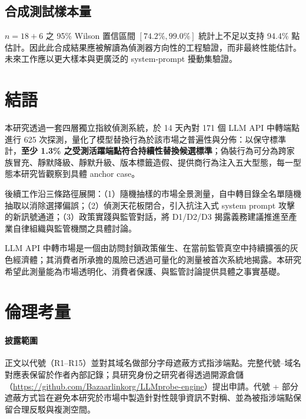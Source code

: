\documentclass[UTF8,fontset=none,10pt,a4paper,twocolumn]{ctexart}
\begin{document}
\subsection{合成測試樣本量}
$n{=}18+6$ 之 95\% Wilson 置信區間 $[74.2\%, 99.0\%]$ 統計上不足以支持 94.4\% 點估計。因此此合成結果應被解讀為偵測器方向性的工程驗證，而非最終性能估計。未來工作應以更大樣本與更廣泛的 system-prompt 擾動集驗證。

\section{結語}\label{sec:conclusion}

本研究透過一套四層獨立指紋偵測系統，於 14 天內對 171 個 LLM API 中轉端點進行 625 次探測，量化了模型替換行為於該市場之普遍性與分佈：以保守標準計，\textbf{至少 1.3\% 之受測活躍端點符合持續性替換候選標準}；偽裝行為可分為跨家族冒充、靜默降級、靜默升級、版本標籤造假、提供商行為注入五大型態，每一型態本研究皆觀察到具體 anchor case。

後續工作沿三條路徑展開：（1）隨機抽樣的市場全景測量，自中轉目錄全名單隨機抽取以消除選擇偏誤；（2）偵測天花板閉合，引入抗注入式 system prompt 攻擊的新訊號通道；（3）政策實踐與監管對話，將 D1/D2/D3 揭露義務建議推進至產業自律組織與監管機關之具體討論。

LLM API 中轉市場是一個由訪問封鎖政策催生、在當前監管真空中持續擴張的灰色經濟體；其消費者所承擔的風險已透過可量化的測量被首次系統地揭露。本研究希望此測量能為市場透明化、消費者保護、與監管討論提供具體之事實基礎。




\appendix
\section{倫理考量}\label{app:ethics}

\paragraph{披露範圍}
正文以代號（R1--R15）並對其域名做部分字母遮蔽方式指涉端點。完整代號--域名對應表保留於作者內部記錄；具研究身份之研究者得透過開源倉儲（\url{https://github.com/Bazaarlinkorg/LLMprobe-engine}）提出申請。代號 + 部分遮蔽方式旨在避免本研究於市場中製造針對性競爭資訊不對稱、並為被指涉端點保留合理反駁與複測空間。
\end{document}
